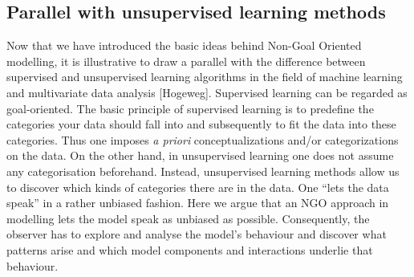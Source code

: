 \subsection{Parallel with unsupervised learning methods}

Now that we have introduced the basic ideas behind Non-Goal Oriented modelling, it is illustrative to draw a parallel with the difference between supervised and unsupervised learning algorithms in the field of machine learning and multivariate data analysis [Hogeweg]. Supervised learning can be regarded as goal-oriented. The basic principle of supervised learning is to predefine the categories your data should fall into and subsequently to fit the data into these categories. Thus one imposes \emph{a priori} conceptualizations and/or categorizations on the data. On the other hand, in unsupervised learning one does not assume any categorisation beforehand. Instead, unsupervised learning methods allow us to discover which kinds of categories there are in the data. One ``lets the data speak'' in a rather unbiased fashion. Here we argue that an NGO approach in modelling lets the model speak as unbiased as possible. Consequently, the observer has to explore and analyse the model’s behaviour and discover what patterns arise and which model components and interactions underlie that behaviour.